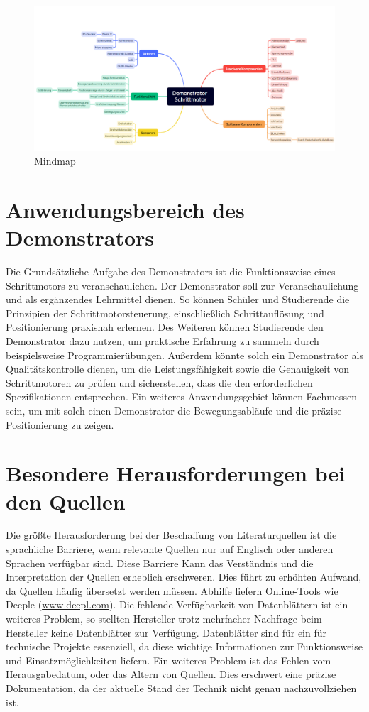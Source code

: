 \begin{figure}[H]
	\begin{center}
		\includegraphics[width=\textwidth]{../Appendix/Mindmap/Mindmap.png}
		\caption{Mindmap} \label{Mindmap}
	\end{center}
\end{figure} 

\section{Anwendungsbereich des Demonstrators}

Die Grundsätzliche Aufgabe des Demonstrators ist die Funktionsweise eines Schrittmotors zu veranschaulichen. Der Demonstrator soll zur Veranschaulichung und als ergänzendes Lehrmittel dienen. So können Schüler und Studierende die Prinzipien der Schrittmotorsteuerung, einschließlich Schrittauflösung und Positionierung praxisnah erlernen. Des Weiteren können Studierende den Demonstrator dazu nutzen, um praktische Erfahrung zu sammeln durch beispielsweise Programmierübungen. Außerdem könnte solch ein Demonstrator als Qualitätskontrolle dienen, um die Leistungsfähigkeit sowie die Genauigkeit von Schrittmotoren zu prüfen und sicherstellen, dass die den erforderlichen Spezifikationen entsprechen. Ein weiteres Anwendungsgebiet können Fachmessen sein, um mit solch einen Demonstrator die Bewegungsabläufe und die präzise Positionierung zu zeigen. 

\section{Besondere Herausforderungen bei den Quellen}

Die größte Herausforderung bei der Beschaffung von Literaturquellen ist die sprachliche Barriere, wenn relevante Quellen nur auf Englisch oder anderen Sprachen verfügbar sind. Diese Barriere Kann das Verständnis und die Interpretation der Quellen erheblich erschweren. Dies führt zu erhöhten Aufwand, da Quellen häufig übersetzt werden müssen. Abhilfe liefern Online-Tools wie Deeple (\href{https://www.deepl.com/de/translator}{www.deepl.com}).
Die fehlende Verfügbarkeit von Datenblättern ist ein weiteres Problem, so stellten Hersteller trotz mehrfacher Nachfrage beim Hersteller keine Datenblätter zur Verfügung. Datenblätter sind für ein für technische Projekte essenziell, da diese wichtige Informationen zur Funktionsweise und Einsatzmöglichkeiten liefern.
Ein weiteres Problem ist das Fehlen vom Herausgabedatum, oder das Altern von Quellen. Dies erschwert eine präzise Dokumentation, da der aktuelle Stand der Technik nicht genau nachzuvollziehen ist. 